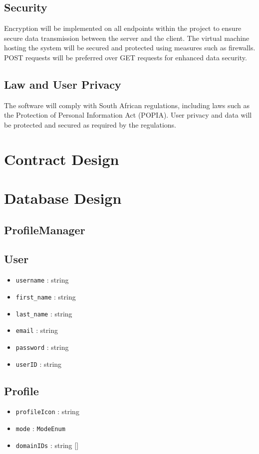 \documentclass[12pt]{article}
\begin{document}
\subsection{Security}
Encryption will be implemented on all endpoints within the project to ensure secure data transmission between the server and the client. The virtual machine hosting the system will be secured and protected using measures such as firewalls. POST requests will be preferred over GET requests for enhanced data security.

\subsection{Law and User Privacy}
The software will comply with South African regulations, including laws such as the Protection of Personal Information Act (POPIA). User privacy and data will be protected and secured as required by the regulations.


\newpage

\section{Contract Design}

\newpage

\section{Database Design}

\subsection{ProfileManager}

\subsection{User}
\begin{itemize}
  \item \texttt{username} : string
  \item \texttt{first\_name} : string
  \item \texttt{last\_name} : string
  \item \texttt{email} : string
  \item \texttt{password} : string
  \item \texttt{userID} : string
\end{itemize}

\subsection{Profile}
\begin{itemize}
  \item \texttt{profileIcon} : string
  \item \texttt{mode} : \texttt{ModeEnum}
  \item \texttt{domainIDs} : string []
\end{itemize}
\end{document}
